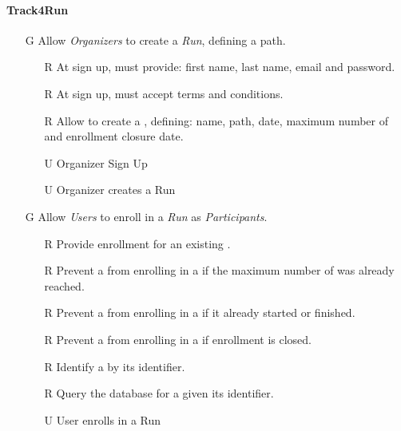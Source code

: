 \documentclass[../../rasd.tex]{subfiles}
\begin{document}
        \paragraph{Track4Run}
        \begin{itemize}
            \item[G\subs{8}]Allow \textit{Organizers} to create a \textit{Run}, defining a path.
            \begin{itemize}
                \item[R\subs{39}]At sign up,  must provide: first name, last name, email and password.
                \item[R\subs{40}]At sign up,  must accept terms and conditions.
                \item[R\subs{41}]Allow  to create a , defining: name, path, date, maximum number of  and enrollment closure date. 
                \\
                \item[U\subs{12}]Organizer Sign Up  
                \item[U\subs{13}]Organizer creates a Run
            \end{itemize}

            \item[G\subs{9}]Allow \textit{Users} to enroll in a \textit{Run} as \textit{Participants}. 
            \begin{itemize}
                \item[R\subs{42}]Provide  enrollment for an existing .
                \item[R\subs{43}]Prevent a  from enrolling in a  if the maximum number of  was already reached.
                \item[R\subs{44}]Prevent a  from enrolling in a  if it already started or finished.
                \item[R\subs{45}]Prevent a  from enrolling in a  if enrollment is closed.
                \item[R\subs{47}]Identify a  by its identifier.
                \item[R\subs{48}]Query the database for a  given its identifier.
                \\
                \item[U\subs{14}]User enrolls in a Run
            \end{itemize}


\end{itemize}
\end{document}
